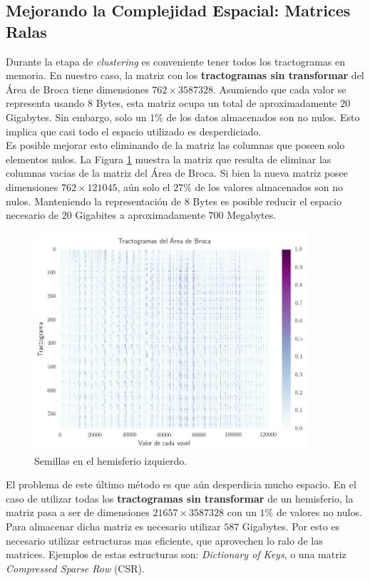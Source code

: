 \subsection{Mejorando la Complejidad Espacial: Matrices Ralas}

Durante la etapa de \textit{clustering} es conveniente tener todos los
tractogramas en memoria. En nuestro caso, la matriz con los \textbf{tractogramas
sin transformar} del \'Area de Broca tiene dimensiones $762\times3587328$. 
Asumiendo que cada valor se representa usando $8$ Bytes, esta matriz ocupa un 
total de aproximadamente $20$ Gigabytes. Sin embargo, solo un $1\%$ de los datos
almacenados son no nulos. Esto implica que casi todo el espacio utilizado es
desperdiciado. \\

Es posible mejorar esto eliminando de la matriz las columnas que poseen solo
elementos nulos. La Figura \ref{fig:densa} muestra la matriz que resulta de
eliminar las columnas vacias de la matriz del \'Area de Broca. Si bien la nueva
matriz posee dimensiones $762\times121045$, a\'un solo el $27\%$ de los valores 
almacenados son no nulos. Manteniendo la representaci\'on de $8$ Bytes es posible
reducir el espacio necesario de $20$ Gigabites a aproximadamente $700$ Megabytes.\\

\begin{figure}[h!]
   \centering
    \includegraphics[width=0.9\textwidth]{img/densa_broca.png}
    \caption{Semillas en el hemisferio izquierdo. }
    \label{fig:densa}
\end{figure}

El problema de este \'ultimo m\'etodo es que a\'un desperdicia mucho espacio. En
el caso de utilizar todas los \textbf{tractogramas sin transformar} de un 
hemisferio, la matriz pasa a ser de dimensiones $21657\times3587328$ con un $1\%$
de valores no nulos. Para almacenar dicha matriz es necesario utilizar $587$ 
Gigabytes. Por esto es necesario utilizar estructuras mas eficiente, que aprovechen
lo ralo de las matrices. Ejemplos de estas estructuras son: \textit{Dictionary of
Keys}, o una matriz \textit{Compressed Sparse Row} (CSR). \\

